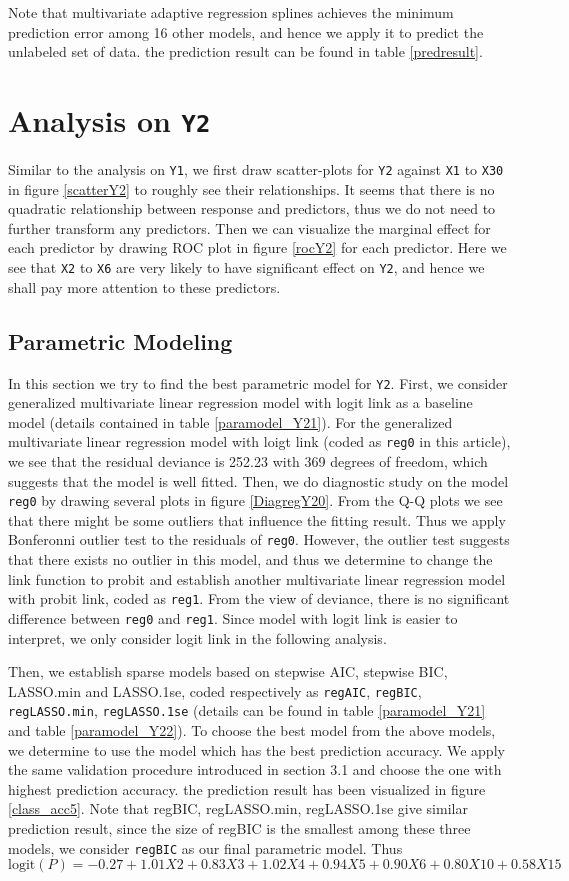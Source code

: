 \documentclass[11pt,oneside,a4paper]{article}
\newcommand{\m}[1]{\texttt{{#1}}}
\begin{document}
Note that multivariate adaptive regression splines achieves the minimum prediction error among 16 other models, and hence we apply it to predict the unlabeled set of data. the prediction result can be found in table \ref{predresult}.

\section{Analysis on \m{Y2}}
Similar to the analysis on \m{Y1}, we first draw scatter-plots for \m{Y2} against \m{X1} to \m{X30} in figure \ref{scatterY2} to roughly see their relationships. It seems that there is no quadratic relationship between response and predictors, thus we do not need to further transform any predictors. Then we can visualize the marginal effect for each predictor by drawing ROC plot in figure \ref{rocY2} for each predictor. Here we see that \m{X2} to \m{X6} are very likely to have significant effect on \m{Y2}, and hence we shall pay more attention to these predictors.

\subsection{Parametric Modeling}
In this section we try to find the best parametric model for \m{Y2}. First, we consider generalized multivariate linear regression model with logit link as a baseline model (details contained in table \ref{paramodel_Y21}). For the generalized multivariate linear regression model with loigt link (coded as \m{reg0} in this article), we see that the residual deviance is 252.23 with 369 degrees of freedom, which suggests that the model is well fitted. Then, we do diagnostic study on the model \m{reg0} by drawing several plots in figure \ref{DiagregY20}. From the Q-Q plots we see that there might be some outliers that influence the fitting result. Thus we apply Bonferonni outlier test to the residuals of \m{reg0}. However, the outlier test suggests that there exists no outlier in this model, and thus we determine to change the link function to probit and establish another multivariate linear regression model with probit link, coded as \m{reg1}. From the view of deviance, there is no significant difference between \m{reg0} and \m{reg1}. Since model with logit link is easier to interpret, we only consider logit link in the following analysis.

Then, we establish sparse models based on stepwise AIC, stepwise BIC, LASSO.min and LASSO.1se, coded respectively as \m{regAIC}, \m{regBIC}, \m{regLASSO.min}, \m{regLASSO.1se} (details can be found in table \ref{paramodel_Y21} and table \ref{paramodel_Y22}). To choose the best model from the above models, we determine to use the model which has the best prediction accuracy. We apply the same validation procedure introduced in section 3.1 and choose the one with highest prediction accuracy. the prediction result has been visualized in figure \ref{class_acc5}. Note that regBIC, regLASSO.min, regLASSO.1se give similar prediction result, since the size of regBIC is the smallest among these three models, we consider \m{regBIC} as our final parametric model. Thus 
$$\mathrm{logit}(P) = -0.27 + 1.01X2 + 0.83X3 + 1.02X4 + 0.94X5 + 0.90X6 + 0.80X10 + 0.58X15$$
\end{document}
